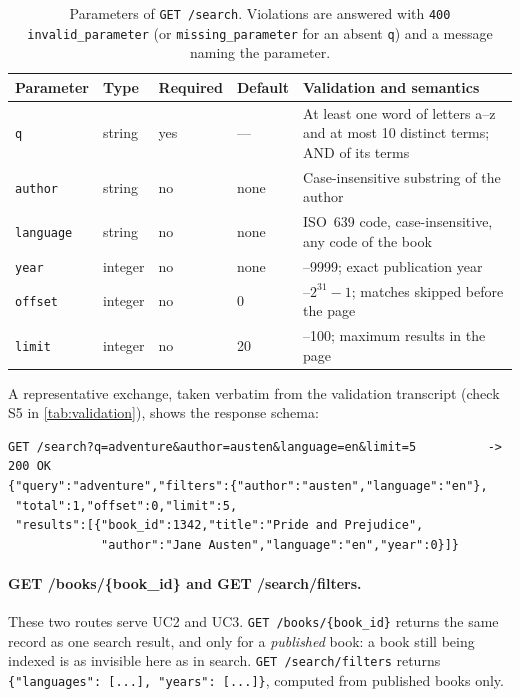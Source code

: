 \documentclass[10pt,a4paper]{article}
\newcommand{\code}[1]{\texttt{#1}}
\newcommand{\route}[1]{\texttt{#1}}
\begin{document}
\begin{table}[htbp]
  \centering
  \footnotesize
  \caption{Parameters of \route{GET /search}. Violations are answered with
  \code{400 invalid\_parameter} (or \code{missing\_parameter} for an absent
  \code{q}) and a message naming the parameter.}
  \label{tab:search-params}
  \begin{tabularx}{\textwidth}{@{}llll>{\raggedright\arraybackslash}X@{}}
    \toprule
    Parameter & Type & Required & Default & Validation and semantics \\
    \midrule
    \code{q} & string & yes & --- & At least one word of letters a--z and at
      most 10 distinct terms; AND of its terms \\
    \code{author} & string & no & none & Case-insensitive substring of the author \\
    \code{language} & string & no & none & ISO~639 code, case-insensitive, any code
      of the book \\
    \code{year} & integer & no & none & 1--9999; exact publication year \\
    \code{offset} & integer & no & 0 & 0--$2^{31}-1$; matches skipped before the page \\
    \code{limit} & integer & no & 20 & 1--100; maximum results in the page \\
    \bottomrule
  \end{tabularx}
\end{table}

A representative exchange, taken verbatim from the validation transcript
(check S5 in \cref{tab:validation}), shows the response schema:

\begin{lstlisting}
GET /search?q=adventure&author=austen&language=en&limit=5          -> 200 OK
{"query":"adventure","filters":{"author":"austen","language":"en"},
 "total":1,"offset":0,"limit":5,
 "results":[{"book_id":1342,"title":"Pride and Prejudice",
             "author":"Jane Austen","language":"en","year":0}]}
\end{lstlisting}

\paragraph{GET /books/\allowbreak\{book\_id\} and GET /search/filters.}
These two routes serve UC2 and UC3. \route{GET /books/\allowbreak\{book\_id\}}
returns the same record as one search result, and only for a \emph{published}
book: a book still being indexed is as invisible here as in search.
\route{GET /search/filters} returns \code{\{"languages": [...], "years":
[...]\}}, computed from published books only.
\end{document}

